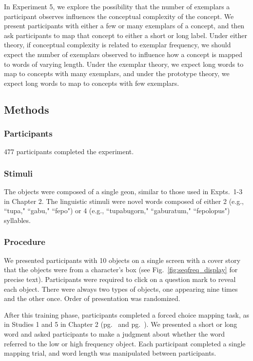 In Experiment 5, we explore the possibility that the number of exemplars a participant observes influences the conceptual complexity of the concept. We present participants with either a few or many exemplars of a concept, and then ask participants to map that concept to either a short or long label. Under either theory, if conceptual complexity is related to exemplar frequency, we should expect the number of exemplars observed to influence how a concept is mapped to words of varying length. Under the exemplar theory, we expect long words to map to concepts with many exemplars, and under the prototype theory, we expect long words to map to concepts with few exemplars.

\subsection{Methods}
\subsubsection{Participants} 
477 participants completed the experiment.
\subsubsection{Stimuli} 
The objects were composed of a single geon, similar to those used in Expts.\ 1-3 in Chapter 2. The linguistic stimuli were novel words composed of either 2 (e.g., ``tupa," ``gabu," ``fepo")  or 4  (e.g., ``tupabugorn," ``gaburatum," ``fepolopus")  syllables.

\subsubsection{Procedure}
We presented participants with 10 objects on a single screen with a cover story that the objects were from a character's box (see Fig.\ \ref{fig:seqfreq_display} for precise text). Participants were required to click on a question mark to reveal each object. There were always two types of objects, one appearing nine times and the other once. Order of presentation was randomized.

After this training phase, participants completed a forced choice mapping task, as in Studies 1 and 5 in Chapter 2 (pg.\ \pageref{ch2-1} and pg.\ \pageref{ch2-5}). We presented a short or long word and asked participants to make a judgment about whether the word referred to the low or high frequency object. Each participant completed a single mapping trial, and word length was manipulated between participants.

